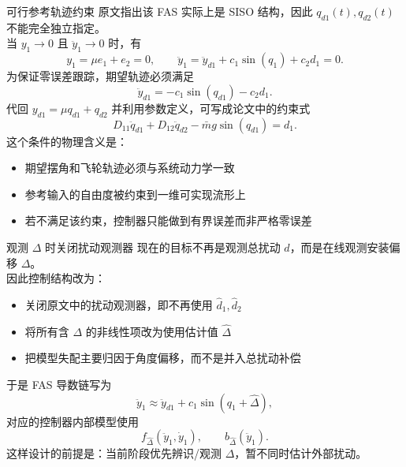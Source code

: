 \begin{frame}{可行参考轨迹约束}
    \scriptsize
    原文指出该 FAS 实际上是 SISO 结构，因此 $q_{d1}(t),q_{d2}(t)$ 不能完全独立指定。\\[0.4em]
    当 $y_1 \to 0$ 且 $\ddot y_1 \to 0$ 时，有
    \[
    y_1 = \mu e_1 + e_2 = 0,
    \qquad
    \ddot y_1 = \ddot y_{d1} + c_1 \sin(q_1) + c_2 d_1 = 0.
    \]
    为保证零误差跟踪，期望轨迹必须满足
    \[
    \ddot y_{d1} = -c_1 \sin(q_{d1}) - c_2 d_1.
    \]
    代回 $y_{d1}=\mu q_{d1}+q_{d2}$ 并利用参数定义，可写成论文中的约束式
    \[
    D_{11}\ddot q_{d1}+D_{12}\ddot q_{d2}-\bar m g \sin(q_{d1})=d_1.
    \]
    这个条件的物理含义是：
    \begin{itemize}
        \setlength{\itemsep}{0.3em}
        \item 期望摆角和飞轮轨迹必须与系统动力学一致
        \item 参考输入的自由度被约束到一维可实现流形上
        \item 若不满足该约束，控制器只能做到有界误差而非严格零误差
    \end{itemize}
\end{frame}

\begin{frame}{观测 $\Delta$ 时关闭扰动观测器}
    \scriptsize
    现在的目标不再是观测总扰动 $d$，而是在线观测安装偏移 $\Delta$。\\[0.4em]
    因此控制结构改为：
    \begin{itemize}
        \setlength{\itemsep}{0.3em}
        \item 关闭原文中的扰动观测器，即不再使用 $\hat d_1,\hat d_2$
        \item 将所有含 $\Delta$ 的非线性项改为使用估计值 $\hat\Delta$
        \item 把模型失配主要归因于角度偏移，而不是并入总扰动补偿
    \end{itemize}
    于是 FAS 导数链写为
    \[
    \ddot y_1 \approx \ddot y_{d1} + c_1 \sin(q_1+\hat\Delta),
    \]
    对应的控制器内部模型使用
    \[
    f_{\hat\Delta}(\ddot y_1,\dot y_1),\qquad b_{\hat\Delta}(\ddot y_1).
    \]
    这样设计的前提是：当前阶段优先辨识/观测 $\Delta$，暂不同时估计外部扰动。
\end{frame}

